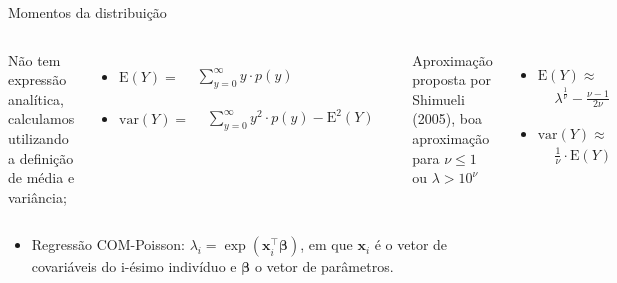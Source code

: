 \documentclass[10pt, aspectratio=169]{beamer}\usepackage[]{graphicx}\usepackage[]{color}
\begin{document}
\begin{frame}{Momentos da distribuição}

\begin{columns}[t,onlytextwidth]
Não tem expressão analítica, calculamos utilizando a definição de média e
variância;
\begin{itemize}
  \itemsep7.5pt\parskip0pt
  \item $\mathrm{E}(Y) = \begin{aligned} 
            &\sum_{y = 0}^{\infty} y \cdot p(y)&
        \end{aligned}
        $
  \item $\mathrm{var}(Y) = \begin{aligned} 
            &\sum_{y = 0}^{\infty} y^2 \cdot p(y) - \mathrm{E}^2(Y)&
        \end{aligned}
        $
\end{itemize}

Aproximação proposta por Shimueli (2005), boa aproximação para $\nu 
\leq 1$ ou $\lambda > 10^\nu$ \\[0.2cm]
\begin{itemize}
  \itemsep7.5pt\parskip0pt
  \item $\mathrm{E}(Y) \approx$ $\begin{aligned} 
            &\lambda ^ \frac{1}{\nu} - \frac{\nu - 1}{2\nu}&
        \end{aligned}
        $ 
  \item $\mathrm{var}(Y) \approx$ $\begin{aligned} 
            &\frac{1}{\nu}\cdot \mathrm{E}(Y)&
        \end{aligned}
        $
\end{itemize}
\end{columns}
\begin{itemize}
  \item Regressão COM-Poisson: $\lambda_i = \exp(\boldsymbol{x}_i^{\top} \boldsymbol{\beta})$, 
  em que $\boldsymbol{x}_i$ é o vetor de covariáveis do i-ésimo indivíduo e 
  $\boldsymbol{\beta}$ o vetor de parâmetros.
\end{itemize}
\end{frame}

\end{document}

